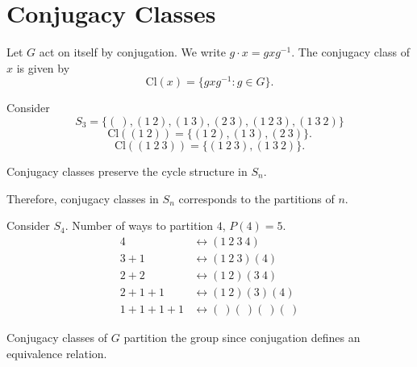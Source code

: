 \section{Conjugacy Classes}
Let $G$ act on itself by conjugation. We write $g \cdot x = g x g^{-1}$. The conjugacy class of $x$ is given by \[\text{Cl} (x) = \{g x g^{-1}: g \in G\}.\]
\begin{eg}
    Consider
    \[S_3 = \{( \ ), (1 \ 2), (1 \ 3), (2 \ 3), (1 \ 2 \ 3), (1 \ 3 \ 2)\}\]
    \[\text{Cl}((1 \ 2)) = \{(1 \ 2), (1 \ 3),(2 \ 3)\}.\]
    \[\text{Cl}((1 \ 2 \ 3)) = \{(1 \ 2 \ 3), (1 \ 3 \ 2)\}.\]
\end{eg}
\begin{theorem}
    Conjugacy classes preserve the cycle structure in $S_n$.
\end{theorem}
\begin{theorem}
    Therefore, conjugacy classes in $S_n$ corresponds to the partitions of $n$.
\end{theorem}
\begin{eg}
    Consider $S_4$. Number of ways to partition $4$, $P(4) = 5$.
    \begin{align*}
        4 &\longleftrightarrow (1 \ 2 \ 3 \ 4)\\
        3 + 1 &\longleftrightarrow (1 \ 2 \ 3) (4)\\
        2 + 2 &\longleftrightarrow (1 \ 2) (3 \ 4)\\
        2 + 1 + 1 &\longleftrightarrow (1 \ 2) (3) (4)\\
        1 + 1 + 1 + 1 &\longleftrightarrow ( \ ) ( \ ) ( \ ) ( \ )
    \end{align*}
\end{eg}
\begin{theorem}
    Conjugacy classes of $G$ partition the group since conjugation defines an equivalence relation.
\end{theorem}
